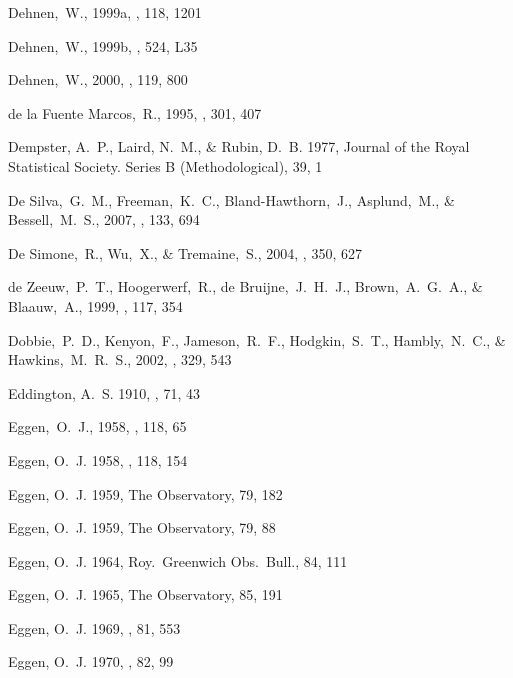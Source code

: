 \begin{thebibliography}{99}
  Dehnen,~W., 1999a, \aj, 118, 1201

  Dehnen,~W., 1999b, \apj, 524, L35

  Dehnen,~W., 2000, \aj, 119, 800

  de la Fuente Marcos,~R., 1995,
  \aap, 301, 407

{Dempster}, A.~P., {Laird}, N.~M., \& {Rubin}, D.~B. 1977, Journal of the Royal
  Statistical Society. Series B (Methodological), 39, 1

  De Silva,~G.~M., Freeman,~K.~C., Bland-Hawthorn,~J., Asplund,~M., \& Bessell,~M.~S., 2007,
  \aj, 133, 694

  De Simone,~R., Wu,~X., \& Tremaine,~S., 2004,
  \mnras, 350, 627

  de Zeeuw,~P.~T., Hoogerwerf,~R., de Bruijne,~J.~H.~J., Brown,~A.~G.~A., \& Blaauw,~A., 1999,
  \aj, 117, 354

  Dobbie,~P.~D., Kenyon,~F., Jameson,~R.~F., Hodgkin,~S.~T., Hambly,~N.~C., \& Hawkins,~M.~R.~S., 2002,
  \mnras, 329, 543

{Eddington}, A.~S. 1910, \mnras, 71, 43

  Eggen,~O.~J., 1958,
  \mnras, 118, 65

{Eggen}, O.~J. 1958, \mnras, 118, 154

{Eggen}, O.~J. 1959{}, The Observatory, 79, 182

{Eggen}, O.~J. 1959{}, The Observatory, 79, 88

{Eggen}, O.~J. 1964, Roy.~Greenwich Obs.~Bull., 84, 111

{Eggen}, O.~J. 1965, The Observatory, 85, 191

{Eggen}, O.~J. 1969, \pasp, 81, 553

{Eggen}, O.~J. 1970, \pasp, 82, 99


\end{thebibliography}
